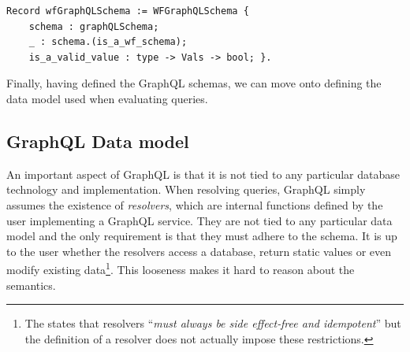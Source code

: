 \begin{verbatim}
Record wfGraphQLSchema := WFGraphQLSchema {
    schema : graphQLSchema;
    _ : schema.(is_a_wf_schema);
    is_a_valid_value : type -> Vals -> bool; }.
\end{verbatim}



Finally, having defined the GraphQL schemas, we can move onto defining the data model used when evaluating queries.

\subsection{GraphQL Data model}\label{subsec:graph}

An important aspect of GraphQL is that it is not tied to any particular database technology and implementation. When resolving queries, GraphQL simply assumes the existence of \textit{resolvers}, which are internal functions defined by the user implementing a GraphQL service. They are not tied to any particular data model and the only requirement is that they must adhere to the schema. It is up to the user whether the resolvers access a database, return static values or even modify existing data\footnote{The \spec{} states that resolvers ``\textit{must always be side effect‐free and idempotent}'' but the definition of a resolver does not actually impose these restrictions.}. This looseness makes it hard to reason about the semantics.

